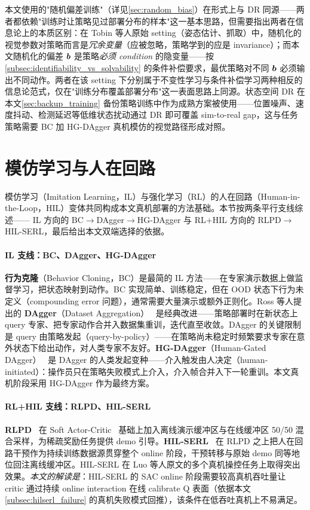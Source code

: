 本文使用的"随机偏差训练"（详见\cref{sec:random_bias}）在形式上与 DR 同源——两者都依赖"训练时让策略见过部署分布的样本"这一基本思路，但需要指出两者在信息论上的本质区别：在 Tobin 等人原始 setting（姿态估计、抓取）中，随机化的视觉参数对策略而言是\emph{冗余变量}（应被忽略，策略学到的应是 invariance）；而本文随机化的偏差 $\bm{b}$ 是策略\emph{必须 condition} 的隐变量——按\cref{subsec:identifiability_vs_solvability} 的条件补偿要求，最优策略对不同 $\bm{b}$ 必须输出不同动作。两者在该 setting 下分别属于不变性学习与条件补偿学习两种相反的信息论范式，仅在"训练分布覆盖部署分布"这一表面思路上同源。状态空间 DR 在本文\cref{sec:backup_training} 备份策略训练中作为成熟方案被使用——位置噪声、速度抖动、检测延迟等低维状态扰动通过 DR 即可覆盖 sim-to-real gap，这与任务策略需要 BC 加 HG-DAgger 真机模仿的视觉路径形成对照。

\section{模仿学习与人在回路}\label{sec:il_hil}

模仿学习（Imitation Learning，IL）与强化学习（RL）的人在回路（Human-in-the-Loop，HIL）变体共同构成本文真机部署的方法基础。本节按两条平行支线综述—— IL 方向的 BC$\to$DAgger$\to$HG-DAgger 与 RL$+$HIL 方向的 RLPD$\to$HIL-SERL，最后给出本文双端选择的依据。

\paragraph{IL 支线：BC、DAgger、HG-DAgger}\textbf{行为克隆}（Behavior Cloning，BC）是最简的 IL 方法——在专家演示数据上做监督学习，把状态映射到动作。BC 实现简单、训练稳定，但在 OOD 状态下行为未定义（compounding error 问题），通常需要大量演示或额外正则化。Ross 等人提出的 \textbf{DAgger}（Dataset Aggregation）~\cite{ross2011dagger} 是经典改进——策略部署时在新状态上 query 专家、把专家动作合并入数据集重训，迭代直至收敛。DAgger 的关键限制是 query 由策略发起（query-by-policy）——在策略尚未稳定时频繁要求专家在意外状态下给出动作，对人类专家不友好。\textbf{HG-DAgger}（Human-Gated DAgger）~\cite{kelly2019hgdagger} 是 DAgger 的人类发起变种——介入触发由人决定（human-initiated）：操作员只在策略失败模式上介入，介入帧合并入下一轮重训。本文真机阶段采用 HG-DAgger 作为最终方案。

\paragraph{RL+HIL 支线：RLPD、HIL-SERL}\textbf{RLPD}~\cite{ball2023rlpd} 在 Soft Actor-Critic~\cite{haarnoja2018sac} 基础上加入离线演示缓冲区与在线缓冲区 50/50 混合采样，为稀疏奖励任务提供 demo 引导。\textbf{HIL-SERL}~\cite{luo2025hilserl} 在 RLPD 之上把人在回路干预作为持续训练数据源贯穿整个 online 阶段，干预转移与原始 demo 同等地位回注离线缓冲区。HIL-SERL 在 Luo 等人原文的多个真机操控任务上取得突出效果。\emph{本文的解读是}：HIL-SERL 的 SAC online 阶段需要较高真机吞吐量让 critic 通过持续 online interaction 在线 calibrate Q 表面（依据本文\cref{subsec:hilserl_failure} 的真机失败模式回推），该条件在低吞吐真机上不易满足。

